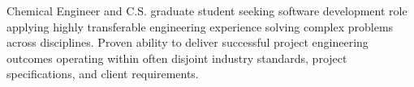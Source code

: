 %
%
%
%
%
{Chemical Engineer and C.S. graduate student seeking software development role applying highly transferable engineering experience solving complex problems across disciplines.}
%
%
%
\statementSpace
%
%
%
%
{Proven ability to deliver successful project engineering outcomes operating within often disjoint industry standards, project specifications, and client requirements. }
%
%
%
%
%
%
%

